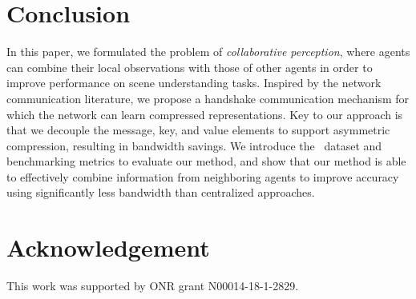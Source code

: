 \documentclass[letterpaper, 10 pt, conference]{ieeeconf}  %
\begin{document}
\section{Conclusion}
\label{sec:conclusion}
In this paper, we formulated the problem of \textit{collaborative perception}, where agents can combine their local observations with those of other agents in order to improve performance on scene understanding tasks. Inspired by the network communication literature, we propose a handshake communication mechanism for which the network can learn compressed representations. 
Key to our approach is that we decouple the message, key, and value elements to support asymmetric compression, resulting in bandwidth savings. We introduce the \DatasetName~dataset and benchmarking metrics to evaluate our method, and show that our method is able to effectively combine information from neighboring agents to improve accuracy using significantly less bandwidth than centralized approaches. 


\vspace{-1mm}
\section{Acknowledgement}
\label{sec:acknowledgement}
This work was supported by ONR grant N00014-18-1-2829.


\clearpage


\printbibliography
\end{document}
